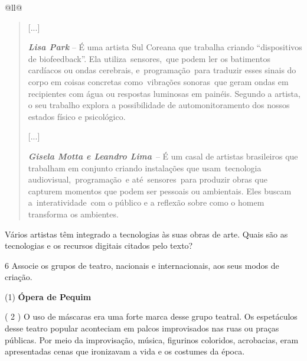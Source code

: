 \begin{itemize}
\begin{itemize}
\begin{escolha}[]{@{}ll@{}}
\begin{quote}
{[}...{]}

\emph{\textbf{Lisa Park}} -- É uma artista Sul Coreana que trabalha
criando ``dispositivos de biofeedback''. Ela utiliza~sensores,~que podem
ler os batimentos cardíacos ou ondas cerebrais, e~programação~para
traduzir esses sinais do corpo em coisas concretas como~vibrações
sonoras~que geram ondas em recipientes com água ou respostas luminosas
em painéis. Segundo a artista, o seu trabalho explora a possibilidade de
automonitoramento dos nossos estados físico e psicológico.

{[}...{]}

\emph{\textbf{Gisela Motta e Leandro Lima}}~-- É um casal de artistas
brasileiros que trabalham em conjunto criando instalações que
usam~tecnologia audiovisual,~programação~e até~sensores~para produzir
obras que capturem momentos que podem ser pessoais ou ambientais. Eles
buscam a~interatividade~com o público e a reflexão sobre como o homem
transforma os ambientes.

\end{quote}

Vários artistas têm integrado a tecnologias às suas obras de arte. Quais
são as tecnologias e os recursos digitais citados pelo texto?


\num{6} Associe os grupos de teatro, nacionais e internacionais, aos seus modos de criação.

(1)  \textbf{Ópera de Pequim}


( 2 ) O uso de máscaras era uma forte marca desse grupo teatral. Os
espetáculos desse teatro popular aconteciam em palcos improvisados nas
ruas ou praças públicas. Por meio da improvisação, música, figurinos
coloridos, acrobacias, eram apresentadas cenas que ironizavam a vida e
os costumes da época.



\end{escolha}
\end{itemize}
\end{itemize}

